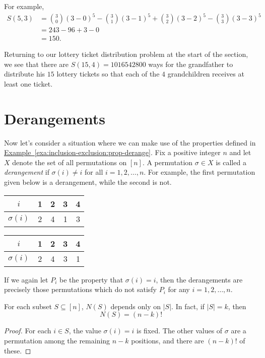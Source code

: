 For example, 
\begin{align*}
S(5,3) &= \binom{3}{0}(3-0)^5-\binom{3}{1}(3-1)^5+\binom{3}{2}(3-2)^5-\binom{3}{3}(3-3)^5\\
       &= 243 -96+3-0\\
       &= 150.
\end{align*}

Returning to our lottery ticket distribution problem at the start of
the section, we see that there are $S(15,4)=1016542800$ ways for the
grandfather to distribute his $15$ lottery tickets so that each of the
$4$ grandchildren receives at least one ticket.

\section{Derangements}\label{s:inclusion-exclusion:derangements}

Now let's consider a situation where we can make use of the properties
defined in
\hyperref[exa:inclusion-exclusion:prop-derange]{Example~\ref*{exa:inclusion-exclusion:prop-derange}}. Fix a
positive integer $n$ and let $X$ denote the set of all permutations on
$[n]$.  A permutation $\sigma\in X$ is called a \textit{derangement}
if $\sigma(i)\neq i$ for all $i=1,2,\dots,n$. For example, the first
permutation given below is a derangement, while the second is not.
\begin{center}
  \begin{tabular}{c|cccc}
    $i$ & 1 & 2 & 3 & 4\\\hline
    $\sigma(i)$ & 2 & 4 & 1 & 3
  \end{tabular}\hspace{0.3in}
  \begin{tabular}{c|cccc}
    $i$ & 1 & 2 & 3 & 4\\\hline
    $\sigma(i)$ & 2 & 4 & 3 & 1
  \end{tabular}
\end{center}
If we again let $P_i$ be the property that $\sigma(i)=i$, then the
derangements are precisely those permutations which do not satisfy
$P_i$ for any $i=1,2,\dots,n$.

\begin{lemma}
  For each subset $S\subseteq [n]$, $N(S)$ depends only on $|S|$.  In
  fact, if $|S|=k$, then
  \[
  N(S) = (n-k)!
  \]
\end{lemma}

\begin{proof}
  For each $i\in S$, the value $\sigma(i)=i$ is fixed.  The other
  values of $\sigma$ are a permutation among the remaining $n-k$
  positions, and there are $(n-k)!$ of these.
\end{proof}

